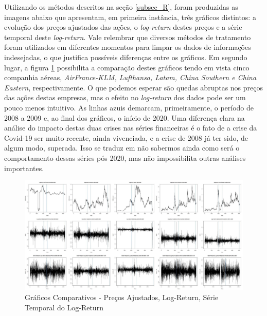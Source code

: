 \documentclass[12pt]{article}
\begin{document}
Utilizando os métodos descritos na seção \ref{subsec_R}, foram produzidas as imagens abaixo que apresentam, em primeira instância, três gráficos distintos: a evolução dos preços ajustados das ações, o \textit{log-return} destes preços e a série temporal deste \textit{log-return}. Vale relembrar que diversos métodos de tratamento foram utilizados em diferentes momentos para limpar os dados de informações indesejadas, o que justifica possíveis diferenças entre os gráficos. Em segundo lugar, a figura \ref{fig:compgeral00a20} possibilita a comparação destes gráficos tendo em vista cinco companhia aéreas, \textit{AirFrance-KLM, Lufthansa, Latam, China Southern e China Eastern}, respectivamente. O que podemos esperar são quedas abruptas nos preços das ações destas empresas, mas o efeito no \textit{log-return} dos dados pode ser um pouco menos intuitivo. As linhas azuis demarcam, primeiramente, o período de 2008 a 2009 e, ao final dos gráficos, o início de 2020. Uma diferença clara na análise do impacto destas duas crises nas séries financeiras é o fato de a crise da Covid-19 ser muito recente, ainda vivenciada, e a crise de 2008 já ter sido, de algum modo, superada. Isso se traduz em não sabermos ainda como será o comportamento dessas séries pós 2020, mas não impossibilita outras análises importantes.

\begin{figure}[H]
	\centering
	\includegraphics[width=1.0\linewidth]{../Modelos/CompGeral00a20}
	\caption{Gráficos Comparativos - Preços Ajustados, Log-Return, Série Temporal do Log-Return}
	\label{fig:compgeral00a20}
\end{figure}
\end{document}
